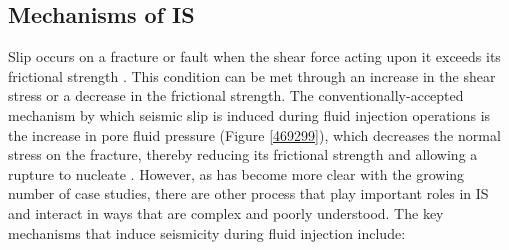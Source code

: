\subsection{Mechanisms of IS}\label{mechanisms}
Slip occurs on a fracture or fault when the shear force acting upon it exceeds its frictional strength \citep{stein_2000}. This condition can be met through an increase in the shear stress or a decrease in the frictional strength. The conventionally-accepted mechanism by which seismic slip is induced during fluid injection operations is the increase in pore fluid pressure (Figure \ref{469299}), which decreases the normal stress on the fracture, thereby reducing its frictional strength and allowing a rupture to nucleate \cite[e.g.][]{Majer_2007}. However, as has become more clear with the growing number of case studies, there are other process that play important roles in IS and interact in ways that are complex and poorly understood. The key mechanisms that induce seismicity during fluid injection include:

